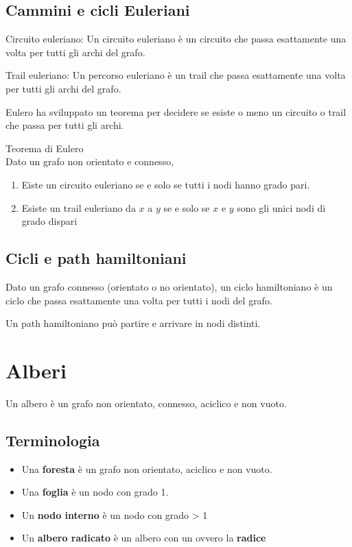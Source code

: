 \documentclass{article}
\begin{document}
\subsection{Cammini e cicli Euleriani}

\begin{dfn}{Circuito euleriano: } 
    Un circuito euleriano è un circuito che passa esattamente una volta per tutti gli archi del grafo.
\end{dfn}

\begin{dfn}{Trail euleriano: }
    Un percorso euleriano è un trail che passa esattamente una volta per tutti gli archi del grafo.
\end{dfn}

\vspace{1 cm}

Eulero ha sviluppato un teorema per decidere se esiste o meno un circuito o trail che passa per tutti gli archi.

\begin{dfn}{Teorema di Eulero}\\
    Dato un grafo non orientato e connesso,
    \begin{enumerate}
        \item Eiste un circuito euleriano se e solo se tutti i nodi hanno grado pari.
        \item Esiste un trail euleriano da \(x\) a \(y\) se e solo se \(x\) e \(y\) sono gli unici nodi di grado dispari
    \end{enumerate}
\end{dfn}

\subsection{Cicli e path hamiltoniani}
Dato un grafo connesso (orientato o no orientato), un ciclo hamiltoniano è un ciclo che passa esattamente una volta per tutti i nodi del grafo.

Un path hamiltoniano può partire e arrivare in nodi distinti.


\section{Alberi}
Un albero è un grafo non orientato, connesso, aciclico e non vuoto.

\subsection{Terminologia}
\begin{itemize}
    \item Una \textbf{foresta} è un grafo non orientato, aciclico e non vuoto.
    \item Una \textbf{foglia} è un nodo con grado 1.
    \item Un \textbf{nodo interno} è un nodo con grado > 1
    \item Un \textbf{albero radicato} è un albero con un  ovvero la \textbf{radice}
\end{itemize}
\end{document}
